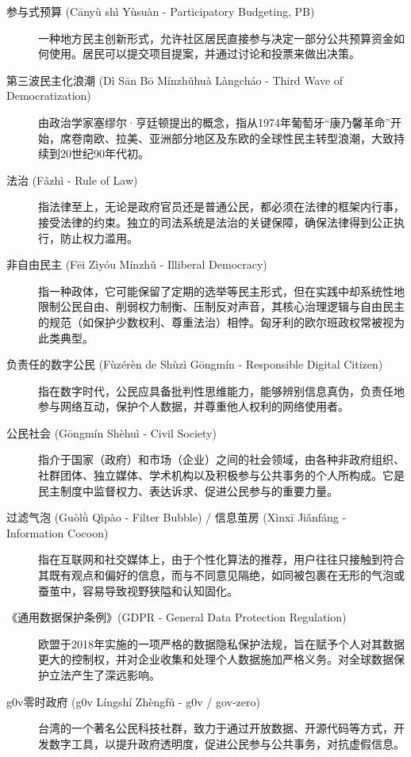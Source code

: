 \documentclass[UTF8, 10pt]{ctexbook}
\begin{document}
\begin{description}
    \item[参与式预算 (Cānyù shì Yùsuàn - Participatory Budgeting, PB)]
    一种地方民主创新形式，允许社区居民直接参与决定一部分公共预算资金如何使用。居民可以提交项目提案，并通过讨论和投票来做出决策。

    \item[第三波民主化浪潮 (Dì Sān Bō Mínzhǔhuà Làngcháo - Third Wave of Democratization)]
    由政治学家塞缪尔·亨廷顿提出的概念，指从1974年葡萄牙“康乃馨革命”开始，席卷南欧、拉美、亚洲部分地区及东欧的全球性民主转型浪潮，大致持续到20世纪90年代初。

    \item[法治 (Fǎzhì - Rule of Law)]
    指法律至上，无论是政府官员还是普通公民，都必须在法律的框架内行事，接受法律的约束。独立的司法系统是法治的关键保障，确保法律得到公正执行，防止权力滥用。

    \item[非自由民主 (Fēi Zìyóu Mínzhǔ - Illiberal Democracy)]
    指一种政体，它可能保留了定期的选举等民主形式，但在实践中却系统性地限制公民自由、削弱权力制衡、压制反对声音，其核心治理逻辑与自由民主的规范（如保护少数权利、尊重法治）相悖。匈牙利的欧尔班政权常被视为此类典型。

    \item[负责任的数字公民 (Fùzérèn de Shùzì Gōngmín - Responsible Digital Citizen)]
    指在数字时代，公民应具备批判性思维能力，能够辨别信息真伪，负责任地参与网络互动，保护个人数据，并尊重他人权利的网络使用者。

    \item[公民社会 (Gōngmín Shèhuì - Civil Society)]
    指介于国家（政府）和市场（企业）之间的社会领域，由各种非政府组织、社群团体、独立媒体、学术机构以及积极参与公共事务的个人所构成。它是民主制度中监督权力、表达诉求、促进公民参与的重要力量。

    \item[过滤气泡 (Guòlǜ Qìpào - Filter Bubble) / 信息茧房 (Xìnxī Jiǎnfáng - Information Cocoon)]
    指在互联网和社交媒体上，由于个性化算法的推荐，用户往往只接触到符合其既有观点和偏好的信息，而与不同意见隔绝，如同被包裹在无形的气泡或蚕茧中，容易导致视野狭隘和认知固化。

    \item[《通用数据保护条例》(GDPR - General Data Protection Regulation)]
    欧盟于2018年实施的一项严格的数据隐私保护法规，旨在赋予个人对其数据更大的控制权，并对企业收集和处理个人数据施加严格义务。对全球数据保护立法产生了深远影响。

    \item[g0v零时政府 (g0v Língshí Zhèngfǔ - g0v / gov-zero)]
    台湾的一个著名公民科技社群，致力于通过开放数据、开源代码等方式，开发数字工具，以提升政府透明度，促进公民参与公共事务，对抗虚假信息。


\end{description}
\end{document}
